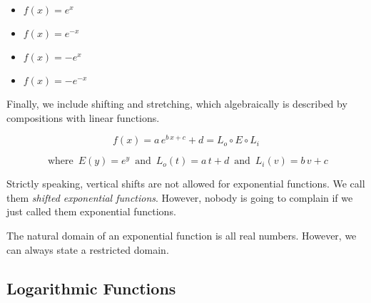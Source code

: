 \documentclass{ximera}
\begin{document}
\begin{template}
\begin{itemize}
\item $f(x) = e^x$ 
\item $f(x) = e^{-x}$ 
\item $f(x) = -e^x$ 
\item $f(x) = -e^{-x}$ 
\end{itemize}






Finally, we include shifting and stretching, which algebraically is described by compositions with linear functions.


\[ f(x) = a \, e^{b \, x + c} + d = L_o \circ E \circ L_i\]

\[
\text{ where } \,  E(y) = e^y   \,  \text{ and } \,   L_o(t) = a \, t + d    \,  \text{ and } \,   L_i(v) = b \, v + c
\]



Strictly speaking, vertical shifts are not allowed for exponential functions.  We call them \textit{shifted exponential functions}.  However, nobody is going to complain if we just called them exponential functions.






\end{template}





The natural domain of an exponential function is all real numbers.  However, we can always state a restricted domain. \\









\subsection{Logarithmic Functions}
\end{document}
